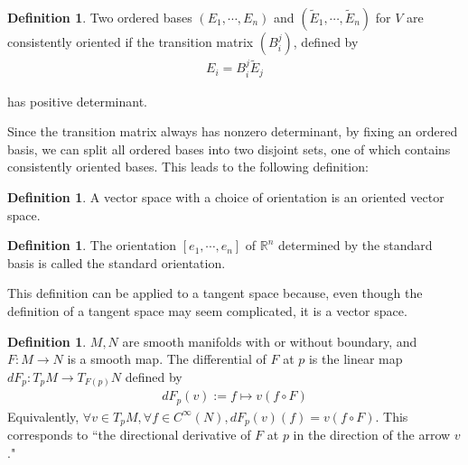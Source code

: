 \documentclass[11pt, psamsfonts]{amsart}
\theoremstyle{definition}
\newtheorem{defn}[thm]{Definition}
\theoremstyle{remark}
\numberwithin{equation}{section}
\begin{document}
\begin{defn}
  Two ordered bases $(E_1, \cdots, E_n)$ and $(\tilde{E}_1, \cdots, \tilde{E}_n)$ for $V$ are consistently oriented if the transition matrix $(B^j_i)$, defined by
  \begin{align*}
    E_i = B^j_i \tilde{E}_j
  \end{align*}

  has positive determinant.
\end{defn}

Since the transition matrix always has nonzero determinant, by fixing an ordered basis, we can split all ordered bases into two disjoint sets, one of which contains consistently oriented bases.
This leads to the following definition:

\begin{defn}
  A vector space with a choice of orientation is an oriented vector space.
\end{defn}

\begin{defn}
  The orientation $[e_1, \cdots, e_n]$ of $\mathbb{R}^n$ determined by the standard basis is called the standard orientation.
\end{defn}

This definition can be applied to a tangent space because, even though the definition of a tangent space may seem complicated, it is a vector space.

% 

% 

\begin{defn}
  $M, N$ are smooth manifolds with or without boundary, and $F: M \rightarrow N$ is a smooth map.
  The differential of $F$ at $p$ is the linear map $dF_p: T_pM \rightarrow T_{F(p)}N$ defined by
  \begin{align*}
    dF_p(v) := f \mapsto v(f \circ F)
  \end{align*}
  Equivalently, $\forall v \in T_pM, \forall f \in C^{\infty}(N), dF_p(v)(f) = v(f \circ F)$.
  This corresponds to ``the directional derivative of $F$ at $p$ in the direction of the arrow $v$."
\end{defn}
\end{document}
